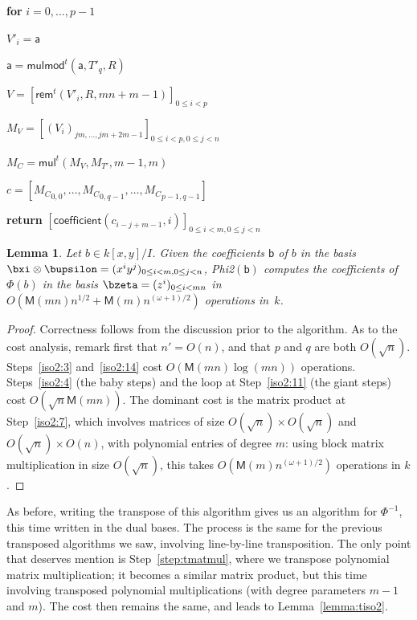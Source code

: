 \documentclass{sig-alternate}
\def\M {\ensuremath{\mathsf{M}}}
\def\va {\ensuremath{\mathsf{a}}}
\def\vb {\ensuremath{\mathsf{b}}}
\def\mul {\ensuremath{\mathsf{mul}}}
\def\rem {\ensuremath{\mathsf{rem}}}
\def\coeff {\ensuremath{\mathsf{coefficient}}}
\def\mulmod {\ensuremath{\mathsf{mulmod}}}
\newcounter{algo}
\newenvironment{algorithm_endline}[4]{\small\begin{center}\begin{minipage}{0.48\textwidth}
      \refstepcounter{algo}
      \label{#4}
      \sf
      \rule{\textwidth}{0.2pt}\\
      \makebox[\textwidth][c]{Algorithm~\arabic{algo}:~\textbf{#1}}\\
      \rule[0.5\baselineskip]{\textwidth}{0.2pt}\\

      \vspace{-12pt}

      \parbox{\textwidth}{\textbf{Input} #2}
      \parbox{\textwidth}{\textbf{Output} #3}

\vspace{-7pt}

      \begin{enumerate*}}{\end{enumerate*}
      \vspace{-11pt}
      \rule{\textwidth}{0.2pt}
\end{minipage}\end{center}
}
\newtheorem{Lemma}{Lemma}
\begin{document}
\begin{algofloat}[t]
\begin{algorithm_endline}
\item {\bf for} {$i=0,\dots,p-1$}
\item \hspace{7mm} $V'_i = \va$
\item \hspace{7mm} $\va = \mulmod^t(\va,T'_q,R)$
\item $V = [\rem^t(V'_i,R,mn+m-1)]_{0 \le i < p}$
\item $M_V = [(V_{i})_{jm,\dots,jm+2m-1}]_{0 \le i < p, 0 \le j < n}$
\item\label{step:tmatmul} $M_C = \mul^t(M_V, M_{T'},m-1,m)$
\item $c=[{M_C}_{0,0},\dots,{M_C}_{0,q-1},\dots,{M_C}_{p-1,q-1}]$
\item {\bf return} $[\coeff(c_{i-j+m-1},i)]_{0 \le i < m, 0 \le j < n}$
  \end{algorithm_endline}
\vspace{-5ex}
\end{algofloat}

\begin{Lemma}
  Let $b \in k[x,y]/I$. Given the coefficients $\vb$ of $b$ in the
  basis $\bxi \otimes \bupsilon=(x^i y^j)_{0 \le i < m, 0 \le j < n}$,
  {\sf Phi2}$(\vb)$ computes the coefficients of $\Phi(b)$ in the
  basis $\bzeta=(z^i)_{0 \le i < mn}$ in $O(\M(mn)n^{1/2}+\M(m)
  n^{(\omega+1)/2} )$ operations in~$k$.
\end{Lemma}
\begin{proof}
  Correctness follows from the discussion prior to the algorithm.  As
  to the cost analysis, remark first that $n'=O(n)$, and that $p$ and
  $q$ are both $O(\sqrt{n})$. Steps~\ref{iso2:3} and~\ref{iso2:14}
  cost $O(\M(mn)\log(mn))$ operations. Steps~\ref{iso2:4} (the baby
  steps) and the loop at Step~\ref{iso2:11} (the giant steps) cost
  $O(\sqrt{n}\M(mn))$. The dominant cost is the matrix product at
  Step~\ref{iso2:7}, which involves matrices of size $O(\sqrt{n})
  \times O(\sqrt{n})$ and $O(\sqrt{n}) \times O(n)$, with polynomial
  entries of degree $m$: using block matrix multiplication in size
  $O(\sqrt{n})$, this takes $O(\M(m) n^{(\omega+1)/2})$ operations in
  $k$.
\end{proof}

As before, writing the transpose of this algorithm gives us an
algorithm for $\Phi^{-1}$, this time written in the dual bases.  The
process is the same for the previous transposed algorithms we saw,
involving line-by-line transposition. The only point that deserves
mention is Step~\ref{step:tmatmul}, where we transpose polynomial
matrix multiplication; it becomes a similar matrix product, but this
time involving transposed polynomial multiplications (with degree
parameters $m-1$ and $m$). The cost then remains the same, and leads to
Lemma~\ref{lemma:tiso2}.
\end{document}
